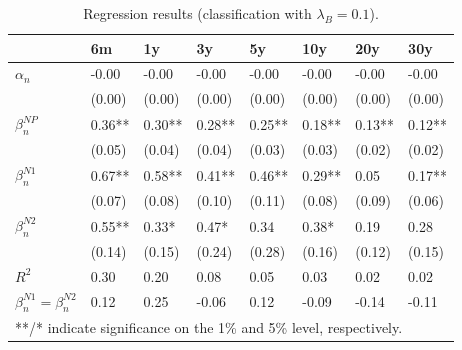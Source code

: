 \documentclass[11pt,a4paper,english,oneside]{book}
\numberwithin{equation}{chapter}
\begin{document}
\begin{table}[h] %
	\centering %
	\begin{tabular}{ p{2cm}  p{1cm} p{1cm} p{1cm} p{1cm} p{1cm} p{1cm} p{1cm} } %
		\toprule %
		& 6m 		& 1y 		& 3y 		& 5y 		& 10y 		& 20y 		& 30y \\
		\midrule %
		$\alpha_n$ & -0.00 & -0.00 & -0.00 & -0.00 & -0.00 & -0.00 & -0.00\\
		& (0.00) & (0.00) & (0.00) & (0.00) & (0.00) & (0.00) & (0.00)\\
		$\beta_n^{NP}$ & 0.36** & 0.30** & 0.28** & 0.25** & 0.18** & 0.13** & 0.12**\\
		& (0.05) & (0.04) & (0.04) & (0.03) & (0.03) & (0.02) & (0.02)\\
		$\beta_n^{N1}$ & 0.67** & 0.58** & 0.41** & 0.46** & 0.29** & 0.05 & 0.17**\\
		& (0.07) & (0.08) & (0.10) & (0.11) & (0.08) & (0.09) & (0.06)\\
		$\beta_n^{N2}$ & 0.55** & 0.33* & 0.47* & 0.34 & 0.38* & 0.19 & 0.28\\
		& (0.14) & (0.15) & (0.24) & (0.28) & (0.16) & (0.12) & (0.15)\\
		$R^2$ & 0.30 & 0.20 & 0.08 & 0.05 & 0.03 & 0.02 & 0.02\\
		$\beta_n^{N1} = \beta_n^{N2}$ & 0.12 & 0.25 & -0.06 & 0.12 & -0.09 & -0.14 & -0.11\\
		\midrule																
		\multicolumn{8}{l}{**/* indicate significance on the 1\% and 5\% level, respectively.} \\
		\bottomrule %
	\end{tabular}
	\caption{Regression results (classification with $\lambda_B=0.1$).} %
	\label{tab:reg2} %
\end{table}
\end{document}
